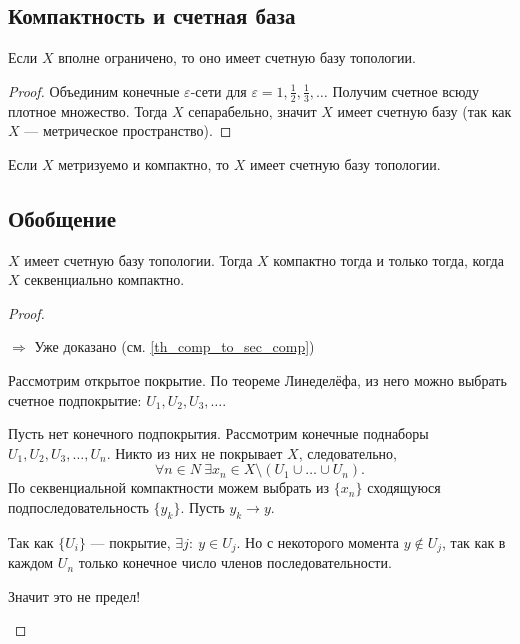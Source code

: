\documentclass[11pt]{book}
\theoremstyle{definition}
\theoremstyle{plain}
\theoremstyle{plain}
\theoremstyle{definition}
\theoremstyle{remark}
\begin{document}
\subsection{Компактность и счетная база}
\begin{thm}
    Если $ X$ вполне ограничено, то оно имеет счетную базу топологии.
\end{thm}
\begin{proof}
    Объединим конечные $ \varepsilon $-сети для  $ \varepsilon = 1, \frac{1}{2}, \frac{1}{3}, \ldots $
    Получим счетное всюду плотное множество. Тогда  $ X$ сепарабельно, значит  $ X$ имеет счетную базу (так как  $ X$ --- метрическое пространство).
\end{proof}
\begin{thm}
    Если $ X$ метризуемо и компактно, то  $ X$ имеет счетную базу топологии.
\end{thm}
\subsection{Обобщение}
\begin{thm}
    $ X$ имеет счетную базу топологии. Тогда   $ X$ компактно  тогда и только тогда, когда $ X$ секвенциально компактно.
\end{thm}
\begin{proof}
    $ $
    \begin{description}
	\item $\boxed{ \Longrightarrow }$  Уже доказано (см. \ref{th_comp_to_sec_comp})
	\item \boxed{ \Longleftarrow } Рассмотрим открытое покрытие. По теореме Линеделёфа, из него можно выбрать счетное подпокрытие: $ U_1, U_2, U_3, \ldots $.

	    Пусть нет конечного подпокрытия.
	    Рассмотрим конечные поднаборы $ U_1, U_2, U_3, \ldots , U_n$. Никто из них не покрывает $ X$, следовательно,
	    \[
		\forall n \in N~ \exists x_n \in X \setminus (U_1 \cup \ldots \cup U_n)
	    .\]
	    По секвенциальной компактности можем выбрать из $ \{x_{n}\}$ сходящуюся подпоследовательность $ \{y_k\}$. Пусть $ y_k \to  y$.

	    Так как $ \{U_i\}$ --- покрытие, $ \exists j: ~ y \in U_j $. Но с некоторого момента $ y \not\in U_j$, так как в каждом $ U_n$ только конечное число членов последовательности.

	    Значит это не предел!
    \end{description}
\end{proof}
\end{document}
